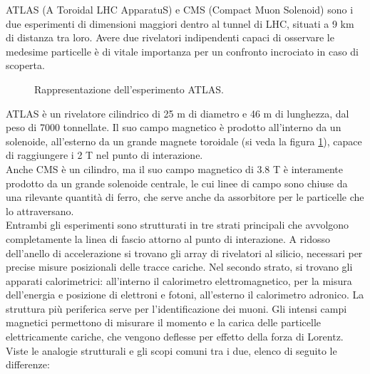 ATLAS (A Toroidal LHC ApparatuS) e CMS (Compact Muon Solenoid) sono i due esperimenti di dimensioni maggiori dentro al tunnel di LHC, situati a 9 km di distanza tra loro. Avere due rivelatori indipendenti capaci di osservare le medesime particelle \`e di vitale importanza per un confronto incrociato in caso di scoperta.

\begin{figure}%
\centering
\caption{Rappresentazione dell'esperimento ATLAS.}
\label{fig:ATLAS}
\end{figure}

\noindent ATLAS \`e un rivelatore cilindrico di 25 m di diametro e 46 m di lunghezza, dal peso di 7000 tonnellate. Il suo campo magnetico \`e prodotto all'interno da un solenoide, all'esterno da un grande magnete toroidale (si veda la figura \ref{fig:ATLAS}), capace di raggiungere i 2 T nel punto di interazione.\\
Anche CMS \`e un cilindro, ma il suo campo magnetico di 3.8 T \`e interamente prodotto da un grande solenoide centrale, le cui linee di campo sono chiuse da una rilevante quantit\`a di ferro, che serve anche da assorbitore per le particelle che lo attraversano.\\
Entrambi gli esperimenti sono strutturati in tre strati principali che avvolgono completamente la linea di fascio attorno al punto di interazione. A ridosso dell'anello di accelerazione si trovano gli array di rivelatori al silicio, necessari per precise misure posizionali delle tracce cariche. Nel secondo strato, si trovano gli apparati calorimetrici: all'interno il calorimetro elettromagnetico, per la misura dell'energia e posizione di elettroni e fotoni, all'esterno il calorimetro adronico. La struttura pi\`u periferica serve per l'identificazione dei muoni. Gli intensi campi magnetici permettono di misurare il momento e la carica delle particelle elettricamente cariche, che vengono deflesse per effetto della forza di Lorentz.\\
Viste le analogie strutturali e gli scopi comuni tra i due, elenco di seguito le differenze:
